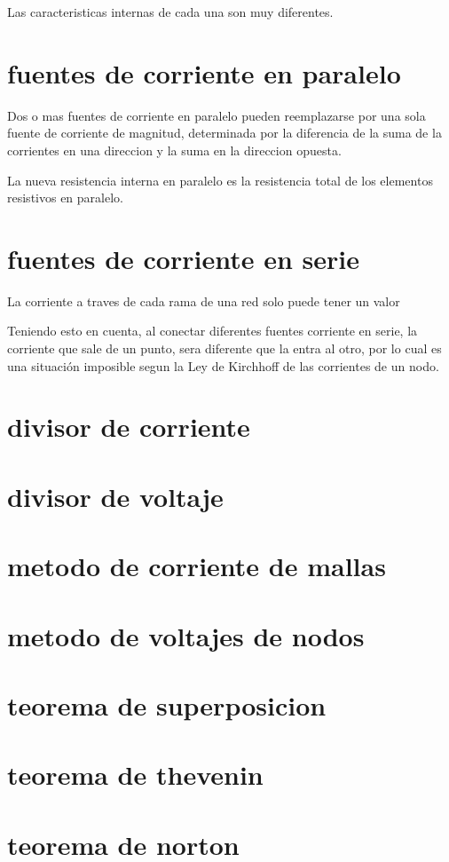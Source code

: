 Las caracteristicas internas de cada una son muy diferentes.

\section*{fuentes de corriente en paralelo}
\justifying
Dos o mas fuentes de corriente en paralelo pueden reemplazarse por una sola fuente de corriente de magnitud, determinada por la diferencia de la suma de la corrientes en una direccion y la suma en la direccion opuesta.

La nueva resistencia interna en paralelo es la resistencia total de los elementos resistivos en paralelo.
\section*{fuentes de corriente en serie}
\justifying
La corriente a traves de cada rama de una red solo puede tener un valor

Teniendo esto en cuenta, al conectar diferentes fuentes corriente en serie, la corriente que sale de un punto, sera diferente que la entra al otro, por lo cual es una situación imposible segun la Ley de Kirchhoff de las corrientes de un nodo.
\section*{divisor de corriente}
\section*{divisor de voltaje}
\section*{metodo de corriente de mallas}
\section*{metodo de voltajes de nodos}
\section*{teorema de superposicion}
\section*{teorema de thevenin}
\section*{teorema de norton}